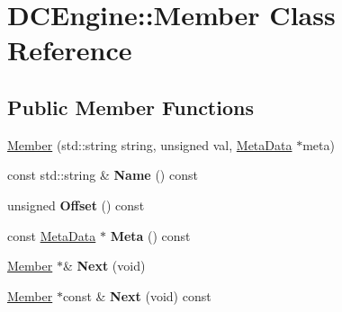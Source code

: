 \hypertarget{classDCEngine_1_1Member}{\section{D\-C\-Engine\-:\-:Member Class Reference}
\label{classDCEngine_1_1Member}
}
\subsection*{Public Member Functions}
\begin{DoxyCompactItemize}
\item 
\hyperlink{classDCEngine_1_1Member_a73edc206a34507d1ebed2edfe94fc92b}{Member} (std\-::string string, unsigned val, \hyperlink{classDCEngine_1_1MetaData}{Meta\-Data} $\ast$meta)
\item 
\hypertarget{classDCEngine_1_1Member_a2904f007ef8b7d37baf3d638de4fadc2}{const std\-::string \& {\bfseries Name} () const }\label{classDCEngine_1_1Member_a2904f007ef8b7d37baf3d638de4fadc2}

\item 
\hypertarget{classDCEngine_1_1Member_a80ca1d8264c3fdfba18894710c0d8305}{unsigned {\bfseries Offset} () const }\label{classDCEngine_1_1Member_a80ca1d8264c3fdfba18894710c0d8305}

\item 
\hypertarget{classDCEngine_1_1Member_a6e1b95b98ab65498400ecd37cc74150c}{const \hyperlink{classDCEngine_1_1MetaData}{Meta\-Data} $\ast$ {\bfseries Meta} () const }\label{classDCEngine_1_1Member_a6e1b95b98ab65498400ecd37cc74150c}

\item 
\hypertarget{classDCEngine_1_1Member_aacf033396f55c08c2cd451b3b61bba4b}{\hyperlink{classDCEngine_1_1Member}{Member} $\ast$\& {\bfseries Next} (void)}\label{classDCEngine_1_1Member_aacf033396f55c08c2cd451b3b61bba4b}

\item 
\hypertarget{classDCEngine_1_1Member_a3536858b8024e4eb90fa8a4d29550d0e}{\hyperlink{classDCEngine_1_1Member}{Member} $\ast$const \& {\bfseries Next} (void) const }\label{classDCEngine_1_1Member_a3536858b8024e4eb90fa8a4d29550d0e}

\end{DoxyCompactItemize}


